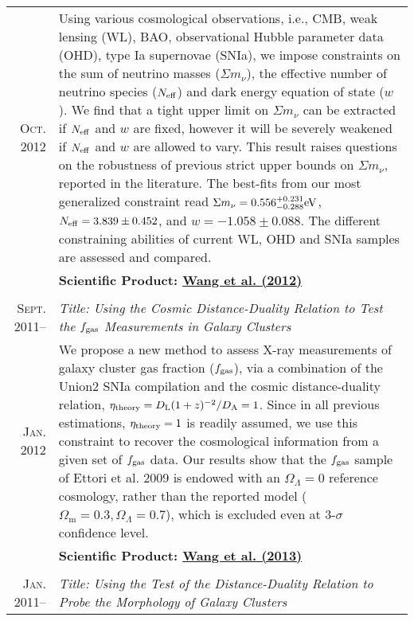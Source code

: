 \documentclass[10pt]{article}
\begin{document}
\begin{longtable}{r|p{17cm}}
  \textsc{Oct. 2012}     &   \small{Using various cosmological observations, i.e., CMB, weak lensing (WL), BAO, observational Hubble
  parameter data (OHD), type Ia supernovae (SNIa), we impose constraints on the sum of neutrino masses ($\Sigma m_{\nu}$), the
  effective number of neutrino species ($N_{\rm eff}$) and dark energy equation of state ($w$). We find that a tight upper limit
  on $\Sigma m_{\nu}$ can be extracted if $N_{\rm eff}$ and $w$ are fixed, however it will be severely weakened if $N_{\rm eff}$ and
  $w$ are allowed to vary. This result raises questions on the robustness of previous strict upper bounds on $\Sigma m_{\nu}$,
  reported in the literature. The best-fits from our most generalized constraint read $\Sigma m_{\nu}=0.556^{+0.231}_{-0.288}\rm
  eV$, $N_{\rm eff}=3.839\pm0.452$, and $w=-1.058\pm0.088$. The different constraining abilities of current WL, OHD and SNIa samples 
  are assessed and compared.}\\
  &   \textbf{Scientific Product: \hyperlink{12.wang.jcap}{Wang et al. (2012)}}  \\
  \multicolumn{2}{c}{} \\
  \textsc{Sept. 2011}--  &   \emph{Title: Using the Cosmic Distance-Duality Relation to Test the $f_{\rm gas}$ Measurements in Galaxy Clusters} \\
  \textsc{Jan. 2012}     &   \small{We propose a new method to assess X-ray measurements of galaxy cluster gas fraction ($f_{\rm
  gas}$), via a combination of the Union2 SNIa compilation and the cosmic distance-duality relation, $\eta_{\rm{theory}}=D_{\rm
  L}(1+z)^{-2}/D_{\rm A}=1$. Since in all previous estimations, $\eta_{\rm{theory}}=1$ is readily assumed, we use this constraint to
  recover the cosmological information from a given set of $f_{\rm gas}$ data. Our results show that the $f_{\rm gas}$ sample of
  Ettori et al. 2009 is endowed with an $\Omega_{\Lambda}=0$ reference cosmology, rather than the reported model
  ($\Omega_\textrm{m}=0.3,\Omega_{\Lambda}=0.7$), which is excluded even at 3-$\sigma$ confidence level.}\\
  &   \textbf{Scientific Product: \hyperlink{13.wang.raa}{Wang et al. (2013)}}  \\
  \multicolumn{2}{c}{} \\
  \textsc{Jan. 2011}--   &   \emph{Title: Using the Test of the Distance-Duality Relation to Probe the Morphology of Galaxy Clusters} \\

\end{longtable}
\end{document}
